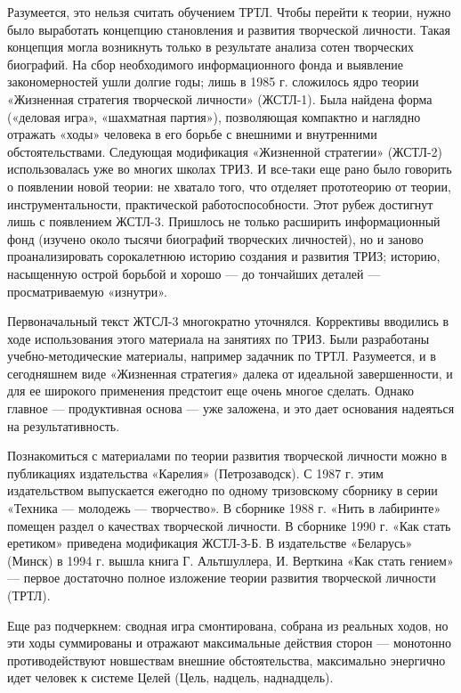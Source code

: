 Разумеется, это нельзя считать обучением ТРТЛ. Чтобы перейти к теории,
нужно  было выработать  концепцию  становления  и развития  творческой
личности. Такая концепция могла возникнуть только в результате анализа
сотен  творческих  биографий.  На  сбор  необходимого  информационного
фонда  и  выявление закономерностей  ушли  долгие  годы; лишь  в  1985
г.  сложилось ядро  теории «Жизненная  стратегия творческой  личности»
(ЖСТЛ-1).  Была найдена  форма («деловая  игра», «шахматная  партия»),
позволяющая компактно и наглядно отражать «ходы» человека в его борьбе
с  внешними  и  внутренними  обстоятельствами.  Следующая  модификация
«Жизненной  стратегии» (ЖСТЛ-2)  использовалась уже  во многих  школах
ТРИЗ. И все-таки  еще рано было говорить о появлении  новой теории: не
хватало того, что отделяет  прототеорию от теории, инструментальности,
практической   работоспособности.   Этот   рубеж  достигнут   лишь   с
появлением ЖСТЛ-3.  Пришлось не  только расширить  информационный фонд
(изучено  около тысячи  биографий творческих  личностей), но  и заново
проанализировать  сорокалетнюю  историю   создания  и  развития  ТРИЗ;
историю, насыщенную острой  борьбой и хорошо — до  тончайших деталей —
просматриваемую «изнутри».

Первоначальный   текст   ЖТСЛ-3  многократно   уточнялся.   Коррективы
вводились в  ходе использования этого  материала на занятиях  по ТРИЗ.
Были разработаны  учебно-методические материалы, например  задачник по
ТРТЛ. Разумеется, и в сегодняшнем виде «Жизненная стратегия» далека от
идеальной завершенности,  и для  ее широкого применения  предстоит еще
очень  многое сделать.  Однако  главное —  продуктивная  основа —  уже
заложена, и это дает основания надеяться на результативность.


Познакомиться  с материалами  по теории  развития творческой  личности
можно в  публикациях издательства «Карелия» (Петрозаводск).  С 1987 г.
этим издательством выпускается ежегодно по одному тризовскому сборнику
в серии «Техника — молодежь —  творчество». В сборнике 1988 г. «Нить в
лабиринте» помещен раздел о  качествах творческой личности. В сборнике
1990  г.  «Как  стать  еретиком»  приведена  модификация  ЖСТЛ-З-Б.  В
издательстве «Беларусь» (Минск) в 1994  г. вышла книга Г. Альтшуллера,
И. Верткина  «Как стать гением»  — первое достаточно  полное изложение
теории развития творческой личности (ТРТЛ).


Еще  раз подчеркнем:  сводная игра  смонтирована, собрана  из реальных
ходов,  но  эти  ходы  суммированы и  отражают  максимальные  действия
сторон — монотонно противодействуют новшествам внешние обстоятельства,
максимально  энергично идет  человек к  системе Целей  (Цель, надцель,
наднадцель).

